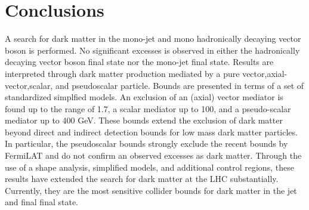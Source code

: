 \section{Conclusions}
A search for dark matter in the mono-jet and mono hadronically decaying vector boson is performed. No significant excesses is observed in either the hadronically decaying vector boson final state nor the mono-jet final state. Results are interpreted  through dark matter production mediated by a pure vector,axial-vector,scalar, and pseudoscalar particle. Bounds are presented in terms of a set of standardized simplfied models.   An exclusion of an (axial) vector mediator is found up to the range of 1.7\TeV, a scalar mediator up to 100\GeV, and a pseudo-scalar mediator up to 400 GeV. These bounds extend the exclusion of dark matter beyond direct and indirect detection bounds for low mass dark matter particles. In particular, the pseudoscalar bounds strongly exclude the recent bounds by FermiLAT and do not confirm an observed excesses as dark matter. 
Through the use of a shape analysis, simplified models, and additional control regions, these results have extended the search for dark matter at the LHC substantially.  Currently, they are the most sensitive collider bounds for dark matter in the jet and \MET final final state. 